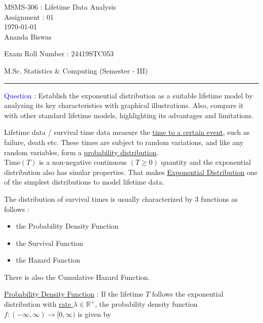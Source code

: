\documentclass[12pt, a4paper, onecolumn, answers]{exam}
\begin{document}
\begingroup  
    \centering
    \LARGE MSMS-306 : Lifetime Data Analysis\\
    \LARGE Assignment : 01\\[0.5em]
    \large \today\\[0.5em]
    \large Ananda Biswas\par
    \large Exam Roll Number : 24419STC053 \par
    \large M.Sc. Statistics \& Computing (Semester - III)\par
\endgroup
\rule{\textwidth}{0.4pt}
\pointsdroppedatright   %
\printanswers
\unframedsolutions
\renewcommand{\solutiontitle}{\noindent\textbf{Ans:}\enspace}   %

\begin{questions}

    \question \textcolor{blue}{Question : }Establish the exponential distribution as a suitable lifetime model by analyzing its key characteristics with graphical illustrations. Also, compare it with other standard lifetime models, highlighting its advantages and limitations.
    
    
\begin{solution}
Lifetime data / survival time data measure the \underline{time to a certain event}, such as failure, death etc. These times are subject to random variations, and like any random variables, form a \underline{probability distribution}. \\[0.15em]

Time$(T)$ is a non-negative continuous $(T \geq 0)$ quantity and the exponential distribution also has similar properties. That makes \underline{Exponential Distribution} one of the simplest distributions to model lifetime data.

The distribution of survival times is usually characterized by 3 functions as follows :
\begin{itemize}
\item the Probability Density Function
\item the Survival Function
\item the Hazard Function
\end{itemize}

There is also the Cumulative Hazard Function.

\vspace{0.1cm}

\leftpointright \hspace{0.1cm} \underline{Probability Density Function} : If the lifetime $T$  follows the exponential distribution with \underline{rate $\lambda \in \mathbb{R^{+}}$}, the probability density function $f : (-\infty, \infty) \rightarrow [0, \infty)$ is given by


\end{solution}
\end{questions}
\end{document}
